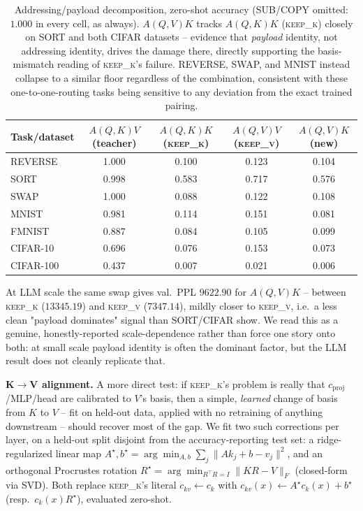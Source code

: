 \documentclass[11pt]{article}
\begin{document}
\begin{table}[h]
\centering
\small
\begin{tabular}{lcccc}
\toprule
Task/dataset & $A(Q,K)V$ (teacher) & $A(Q,K)K$ (\textsc{keep\_k}) & $A(Q,V)V$ (\textsc{keep\_v}) & $A(Q,V)K$ (new) \\
\midrule
REVERSE   & 1.000 & 0.100 & 0.123 & 0.104 \\
SORT      & 0.998 & 0.583 & 0.717 & 0.576 \\
SWAP      & 1.000 & 0.088 & 0.122 & 0.108 \\
MNIST     & 0.981 & 0.114 & 0.151 & 0.081 \\
FMNIST    & 0.887 & 0.084 & 0.105 & 0.099 \\
CIFAR-10  & 0.696 & 0.076 & 0.153 & 0.073 \\
CIFAR-100 & 0.437 & 0.007 & 0.021 & 0.006 \\
\bottomrule
\end{tabular}
\caption{Addressing/payload decomposition, zero-shot accuracy (SUB/COPY omitted:
$1.000$ in every cell, as always). $A(Q,V)K$ tracks $A(Q,K)K$ (\textsc{keep\_k})
closely on SORT and both CIFAR datasets -- evidence that \emph{payload} identity,
not addressing identity, drives the damage there, directly supporting the
basis-mismatch reading of \textsc{keep\_k}'s failure. REVERSE, SWAP, and MNIST
instead collapse to a similar floor regardless of the combination, consistent with
these one-to-one-routing tasks being sensitive to any deviation from the exact
trained pairing.}
\label{tab:decomposition}
\end{table}

At LLM scale the same swap gives val.\ PPL $9622.90$ for $A(Q,V)K$ -- between
\textsc{keep\_k} ($13345.19$) and \textsc{keep\_v} ($7347.14$), mildly closer to
\textsc{keep\_v}, i.e.\ a less clean "payload dominates" signal than SORT/CIFAR
show. We read this as a genuine, honestly-reported scale-dependence rather than
force one story onto both: at small scale payload identity is often the dominant
factor, but the LLM result does not cleanly replicate that.

\textbf{K$\to$V alignment.} A more direct test: if \textsc{keep\_k}'s problem is
really that $c_{\text{proj}}$/MLP/head are calibrated to $V$'s basis, then a simple,
\emph{learned} change of basis from $K$ to $V$ -- fit on held-out data, applied with
no retraining of anything downstream -- should recover most of the gap. We fit two
such corrections per layer, on a held-out split disjoint from the accuracy-reporting
test set: a ridge-regularized linear map $A^\star, b^\star = \arg\min_{A,b}
\sum_j \lVert A k_j + b - v_j \rVert^2$, and an orthogonal Procrustes rotation
$R^\star = \arg\min_{R^\top R = I} \lVert KR - V \rVert_F$ (closed-form via SVD).
Both replace \textsc{keep\_k}'s literal $c_{kv} \leftarrow c_k$ with $c_{kv}(x)
\leftarrow A^\star c_k(x) + b^\star$ (resp.\ $c_k(x) R^\star$), evaluated zero-shot.
\end{document}
